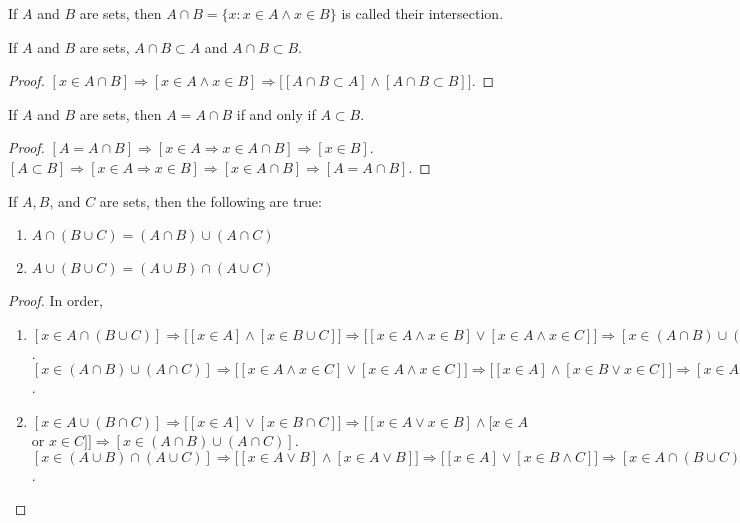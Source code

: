 \documentclass[crop=false,class=book]{standalone}
\begin{document}
\begin{definition}
If $A$ and $B$ are sets, then $A\cap B = \{x:x\in A \land x\in B\}$ is called their intersection.
\end{definition}
\begin{corollary}
If $A$ and $B$ are sets, $A\cap B \subset A$ and $A\cap B \subset B$.
\end{corollary}
\begin{proof}
$[x\in A\cap B]\Rightarrow [x\in A\land x\in B]\Rightarrow \big[[A\cap B \subset A]\land [A\cap B \subset B]\big]$.
\end{proof}
\begin{theorem}
If $A$ and $B$ are sets, then $A=A\cap B$ if and only if $A\subset B$.
\end{theorem}
\begin{proof}
$[A=A\cap B]\Rightarrow [x\in A\Rightarrow x\in A \cap B]\Rightarrow [x\in B]$. $[A\subset B]\Rightarrow [x\in A\Rightarrow x\in B]\Rightarrow [x\in A\cap B]\Rightarrow [A=A\cap B]$.
\end{proof}
\begin{theorem}
If $A,B$, and $C$ are sets, then the following are true:
\begin{enumerate}
\item $A\cap (B\cup C) = (A\cap B)\cup (A\cap C)$
\item $A\cup (B\cup C) = (A\cup B)\cap (A\cup C)$
\end{enumerate}
\end{theorem}
\begin{proof}
In order,
\begin{enumerate}
\item $[x\in A\cap (B\cup C)]\Rightarrow \big[[x\in A] \land [x\in B\cup C]\big]\Rightarrow \big[[x\in A\land x\in B]\lor [x\in A\land x\in C]\big]\Rightarrow [x\in (A\cap B)\cup (A\cap C)]$. $[x\in (A\cap B)\cup(A\cap C)]\Rightarrow \big[[x\in A\land x\in C]\lor [x\in A \land x\in C]\big]\Rightarrow \big[[x\in A]\land [x\in B\lor x\in C]\big]\Rightarrow [x\in A\cap(B\cup C)]$.
\item $[x\in A\cup (B\cap C)]\Rightarrow \big[[x\in A]\lor [x\in B\cap C]\big] \Rightarrow \big[[x\in A \lor x\in B]\land [x\in A$ or $x\in C]\big]\Rightarrow [x\in (A\cap B)\cup (A\cap C)]$. $[x\in (A\cup B)\cap (A\cup C)]\Rightarrow \big[[x\in A\lor B]\land [x\in A\lor B]\big]\Rightarrow \big[[x\in A]\lor[x\in B\land C]\big]\Rightarrow [x\in A\cap(B\cup C)]$.
\end{enumerate}
\end{proof}
\end{document}
